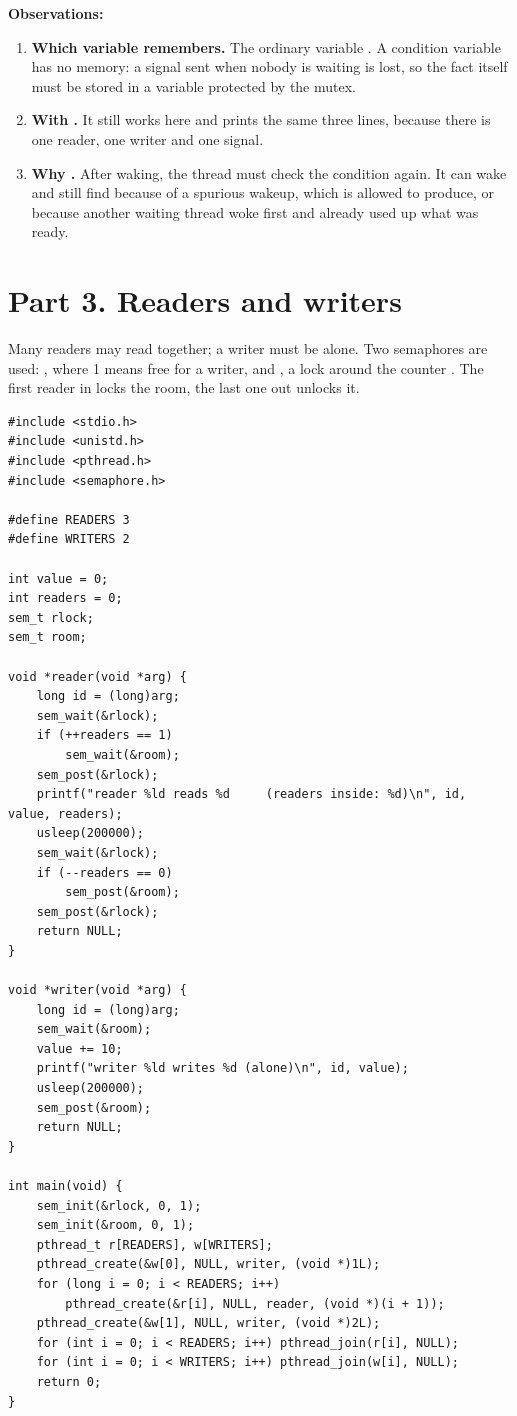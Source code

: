 \documentclass[11pt,a4paper]{article}
\begin{document}
\textbf{Observations:}
\begin{enumerate}
  \item \textbf{Which variable remembers.} The ordinary variable . A condition
  variable has no memory: a signal sent when nobody is waiting is lost, so the fact itself must
  be stored in a variable protected by the mutex.
  \item \textbf{With .} It still works here and prints the same three lines, because
  there is one reader, one writer and one signal.
  \item \textbf{Why .} After waking, the thread must check the condition again. It
  can wake and still find  because of a spurious wakeup, which
   is allowed to produce, or because another waiting thread woke
  first and already used up what was ready.
\end{enumerate}

\section{Part 3. Readers and writers}

Many readers may read together; a writer must be alone. Two semaphores are used: ,
where 1 means free for a writer, and , a lock around the counter .
The first reader in locks the room, the last one out unlocks it.

\begin{lstlisting}[style=ccode,caption={readers.c}]
#include <stdio.h>
#include <unistd.h>
#include <pthread.h>
#include <semaphore.h>

#define READERS 3
#define WRITERS 2

int value = 0;
int readers = 0;
sem_t rlock;
sem_t room;

void *reader(void *arg) {
    long id = (long)arg;
    sem_wait(&rlock);
    if (++readers == 1)
        sem_wait(&room);
    sem_post(&rlock);
    printf("reader %ld reads %d     (readers inside: %d)\n", id, value, readers);
    usleep(200000);
    sem_wait(&rlock);
    if (--readers == 0)
        sem_post(&room);
    sem_post(&rlock);
    return NULL;
}

void *writer(void *arg) {
    long id = (long)arg;
    sem_wait(&room);
    value += 10;
    printf("writer %ld writes %d (alone)\n", id, value);
    usleep(200000);
    sem_post(&room);
    return NULL;
}

int main(void) {
    sem_init(&rlock, 0, 1);
    sem_init(&room, 0, 1);
    pthread_t r[READERS], w[WRITERS];
    pthread_create(&w[0], NULL, writer, (void *)1L);
    for (long i = 0; i < READERS; i++)
        pthread_create(&r[i], NULL, reader, (void *)(i + 1));
    pthread_create(&w[1], NULL, writer, (void *)2L);
    for (int i = 0; i < READERS; i++) pthread_join(r[i], NULL);
    for (int i = 0; i < WRITERS; i++) pthread_join(w[i], NULL);
    return 0;
}
\end{lstlisting}
\end{document}
